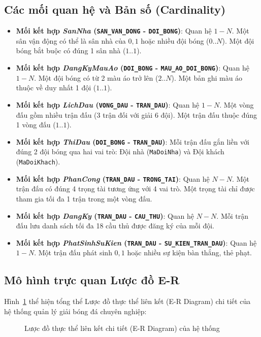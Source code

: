 \subsection{Các mối quan hệ và Bản số (Cardinality)}
\begin{itemize}
    \item \textbf{Mối kết hợp \textit{SanNha} (\texttt{SAN\_VAN\_DONG} - \texttt{DOI\_BONG})}:
    Quan hệ $1 - N$. Một sân vận động có thể là sân nhà của $0, 1$ hoặc nhiều đội bóng ($0..N$). Một đội bóng bắt buộc có đúng 1 sân nhà ($1..1$).
    \item \textbf{Mối kết hợp \textit{DangKyMauAo} (\texttt{DOI\_BONG} - \texttt{MAU\_AO\_DOI\_BONG})}:
    Quan hệ $1 - N$. Một đội bóng có từ 2 màu áo trở lên ($2..N$). Một bản ghi màu áo thuộc về duy nhất 1 đội ($1..1$).
    \item \textbf{Mối kết hợp \textit{LichDau} (\texttt{VONG\_DAU} - \texttt{TRAN\_DAU})}:
    Quan hệ $1 - N$. Một vòng đấu gồm nhiều trận đấu ($3$ trận đối với giải 6 đội). Một trận đấu thuộc đúng 1 vòng đấu ($1..1$).
    \item \textbf{Mối kết hợp \textit{ThiDau} (\texttt{DOI\_BONG} - \texttt{TRAN\_DAU})}:
    Mỗi trận đấu gắn liền với đúng 2 đội bóng qua hai vai trò: Đội nhà (\texttt{MaDoiNha}) và Đội khách (\texttt{MaDoiKhach}).
    \item \textbf{Mối kết hợp \textit{PhanCong} (\texttt{TRAN\_DAU} - \texttt{TRONG\_TAI})}:
    Quan hệ $N - N$. Một trận đấu có đúng 4 trọng tài tương ứng với 4 vai trò. Một trọng tài chỉ được tham gia tối đa 1 trận trong một vòng đấu.
    \item \textbf{Mối kết hợp \textit{DangKy} (\texttt{TRAN\_DAU} - \texttt{CAU\_THU})}:
    Quan hệ $N - N$. Mỗi trận đấu lưu danh sách tối đa 18 cầu thủ được đăng ký của mỗi đội.
    \item \textbf{Mối kết hợp \textit{PhatSinhSuKien} (\texttt{TRAN\_DAU} - \texttt{SU\_KIEN\_TRAN\_DAU})}:
    Quan hệ $1 - N$. Một trận đấu phát sinh $0, 1$ hoặc nhiều sự kiện bàn thắng, thẻ phạt.
\end{itemize}

\subsection{Mô hình trực quan Lược đồ E-R}
Hình~\ref{fig:er_diagram} thể hiện tổng thể Lược đồ thực thể liên kết (E-R Diagram) chi tiết của hệ thống quản lý giải bóng đá chuyên nghiệp:

\begin{figure}[H]
    \centering
    \caption{Lược đồ thực thể liên kết chi tiết (E-R Diagram) của hệ thống}
    \label{fig:er_diagram}
\end{figure}
